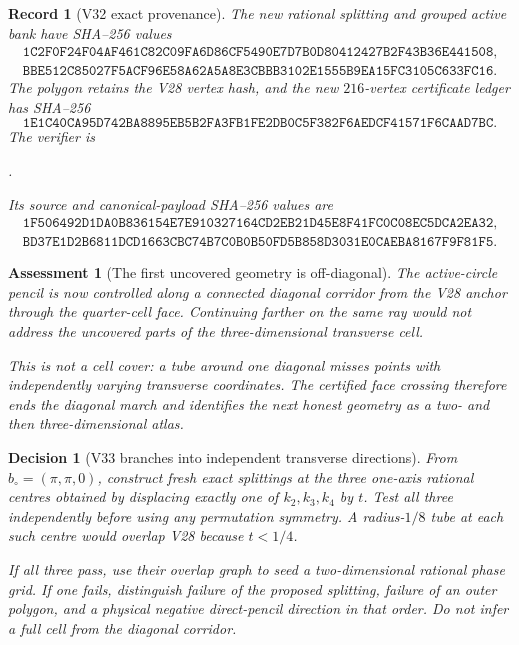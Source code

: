 \documentclass[11pt,oneside]{article}
\newtheorem{assessment}[theorem]{Assessment}
\newtheorem{record}[theorem]{Record}
\newtheorem{decision}[theorem]{Decision}
\theoremstyle{definition}
\theoremstyle{remark}
\begin{document}
\begin{record}[V32 exact provenance]
\label{rec:newv32-provenance}
The new rational splitting and grouped active bank have SHA--256
values
\[
\begin{gathered}
\texttt{1C2F0F24F04AF461C82C09FA6D86CF5490E7D7B0D80412427B2F43B36E441508},\\
\texttt{BBE512C85027F5ACF96E58A62A5A8E3CBBB3102E1555B9EA15FC3105C633FC16}.
\end{gathered}                                          \tag{32.15}
\]
The polygon retains the V28 vertex hash, and the new
\(216\)-vertex certificate ledger has SHA--256
\[
\texttt{1E1C40CA95D742BA8895EB5B2FA3FB1FE2DB0C5F382F6AEDCF41571F6CAAD7BC}.
                                                               \tag{32.16}
\]
The verifier is
\begin{center}
\footnotesize
{}.
\end{center}
Its source and canonical-payload SHA--256 values are
\[
\begin{gathered}
\texttt{1F506492D1DA0B836154E7E910327164CD2EB21D45E8F41FC0C08EC5DCA2EA32},\\
\texttt{BD37E1D2B6811DCD1663CBC74B7C0B0B50FD5B858D3031E0CAEBA8167F9F81F5}.
\end{gathered}                                          \tag{32.17}
\]
\end{record}

\begin{assessment}[The first uncovered geometry is off-diagonal]
\label{ass:newv32}
The active-circle pencil is now controlled along a connected
diagonal corridor from the V28 anchor through the quarter-cell
face.  Continuing farther on the same ray would not address the
uncovered parts of the three-dimensional transverse cell.

This is not a cell cover: a tube around one diagonal misses points
with independently varying transverse coordinates.  The certified
face crossing therefore ends the diagonal march and identifies the
next honest geometry as a two- and then three-dimensional atlas.
\end{assessment}

\begin{decision}[V33 branches into independent transverse directions]
\label{dec:newv32-next}
From \(b_\circ=(\pi,\pi,0)\), construct fresh exact splittings at
the three one-axis rational centres obtained by displacing exactly
one of \(k_2,k_3,k_4\) by \(t\).  Test all three independently before
using any permutation symmetry.  A radius-\(1/8\) tube at each such
centre would overlap V28 because \(t<1/4\).

If all three pass, use their overlap graph to seed a two-dimensional
rational phase grid.  If one fails, distinguish failure of the
proposed splitting, failure of an outer polygon, and a physical
negative direct-pencil direction in that order.  Do not infer a
full cell from the diagonal corridor.
\end{decision}
\end{document}
